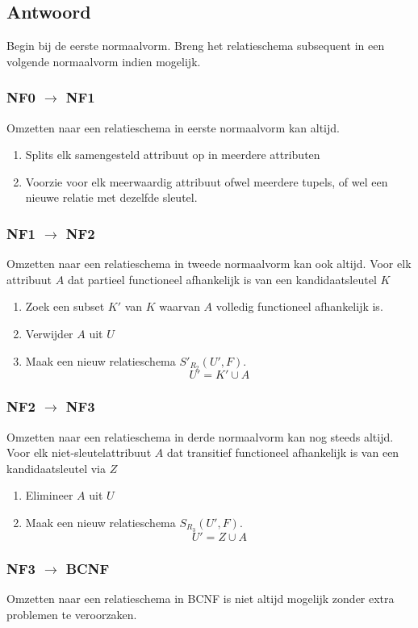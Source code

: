 \documentclass[normaalvormen.tex]{subfiles}
\begin{document}
\subsection*{Antwoord}
Begin bij de eerste normaalvorm. Breng het relatieschema subsequent  in een volgende normaalvorm indien mogelijk.

\subsubsection*{NF0 $\rightarrow$ NF1}
Omzetten naar een relatieschema in eerste normaalvorm kan altijd.
\begin{enumerate}
\item Splits elk samengesteld attribuut op in meerdere attributen
\item Voorzie voor elk meerwaardig attribuut ofwel meerdere tupels, of wel een nieuwe relatie met dezelfde sleutel.
\end{enumerate}

\subsubsection*{NF1 $\rightarrow$ NF2}
Omzetten naar een relatieschema in tweede normaalvorm kan ook altijd. Voor elk attribuut $A$ dat partieel functioneel afhankelijk is van een kandidaatsleutel $K$
\begin{enumerate}
\item Zoek een subset $K'$ van $K$ waarvan $A$ volledig functioneel afhankelijk is.
\item Verwijder $A$ uit $U$
\item Maak een nieuw relatieschema $S'_{R_{2}}(U',F)$.
\[
U' = K'\cup A
\] 
\end{enumerate}

\subsubsection*{NF2 $\rightarrow$ NF3}
Omzetten naar een relatieschema in derde normaalvorm kan nog steeds altijd. Voor elk niet-sleutelattribuut $A$ dat transitief functioneel afhankelijk is van een kandidaatsleutel via $Z$
\begin{enumerate}
\item Elimineer $A$ uit $U$
\item Maak een nieuw relatieschema $S_{R_{3}}(U',F)$.
\[
U' = Z \cup A
\]
\end{enumerate}

\subsubsection*{NF3 $\rightarrow$ BCNF}
Omzetten naar een relatieschema in BCNF is niet altijd mogelijk zonder extra problemen te veroorzaken.
\end{document}
